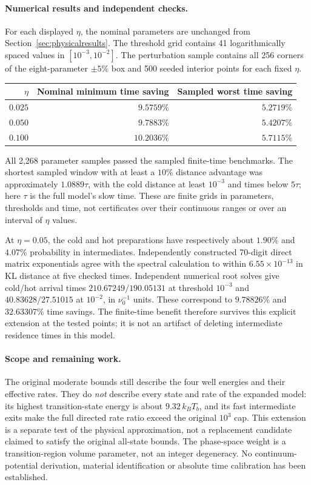 \paragraph{Numerical results and independent checks.}
For each displayed $\eta$, the nominal parameters are unchanged from
Section~\ref{sec:physicalresults}. The threshold grid contains 41
logarithmically spaced values in $[10^{-3},10^{-2}]$. The perturbation
sample contains all 256 corners of the eight-parameter $\pm5\%$ box
and 500 seeded interior points for each fixed $\eta$.
\begin{center}
\begin{tabular}{rrr}
\toprule
$\eta$ & Nominal minimum time saving & Sampled worst time saving\\
\midrule
$0.025$ & $9.5759\%$ & $5.2719\%$\\
$0.050$ & $9.7883\%$ & $5.4207\%$\\
$0.100$ & $10.2036\%$ & $5.7115\%$\\
\bottomrule
\end{tabular}
\end{center}
All 2,268 parameter samples passed the sampled finite-time benchmarks.
The shortest sampled window with at least a $10\%$ distance advantage
was approximately $1.0889\tau$, with the cold distance at least $10^{-3}$
and times below $5\tau$; here $\tau$ is the full model's slow time.
These are finite grids in parameters, thresholds and time, not certificates
over their continuous ranges or over an interval of $\eta$ values.

At $\eta=0.05$, the cold and hot preparations have respectively about
$1.90\%$ and $4.07\%$ probability in intermediates. Independently
constructed 70-digit direct matrix exponentials agree with the spectral
calculation to within $6.55\times10^{-13}$ in KL distance at five checked
times. Independent numerical root solves give cold/hot arrival times
$210.67249/190.05131$ at threshold $10^{-3}$ and
$40.83628/27.51015$ at $10^{-2}$, in $\nu_0^{-1}$ units.
These correspond to $9.78826\%$ and $32.63307\%$ time savings.
The finite-time benefit therefore survives this explicit extension at
the tested points; it is not an artifact of deleting intermediate
residence times in this model.

\paragraph{Scope and remaining work.}
The original moderate bounds still describe the four well energies and
their effective rates. They do \emph{not} describe every state and rate
of the expanded model: its highest transition-state energy is about
$9.32\,k_BT_b$, and its fast intermediate exits make the full directed
rate ratio exceed the original $10^3$ cap. This extension is a separate
test of the physical approximation, not a replacement candidate claimed
to satisfy the original all-state bounds. The phase-space weight is a
transition-region volume parameter, not an integer degeneracy.
No continuum-potential derivation, material identification or absolute
time calibration has been established.

